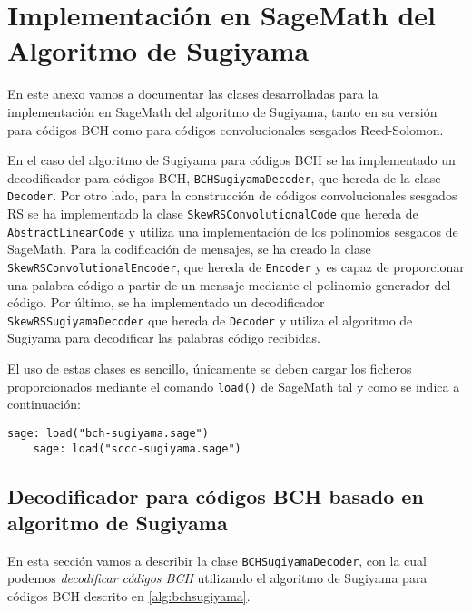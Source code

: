 
\chapter{Implementación en SageMath del Algoritmo de Sugiyama}\label{ap:codigo}

En este anexo vamos a documentar las clases desarrolladas para la implementación en SageMath del algoritmo de Sugiyama, tanto en su versión para códigos BCH como para códigos convolucionales  sesgados Reed-Solomon.

En el caso del algoritmo de Sugiyama para códigos BCH se ha implementado un decodificador para códigos BCH, \texttt{BCHSugiyamaDecoder}, que hereda de la clase \texttt{Decoder}. Por otro lado, para la construcción de códigos convolucionales sesgados RS se ha implementado la clase \texttt{SkewRSConvolutionalCode} que hereda de \texttt{AbstractLinearCode}  y utiliza una implementación de los polinomios sesgados de SageMath. Para la codificación de mensajes, se ha creado la clase \texttt{SkewRSConvolutionalEncoder}, que hereda de \texttt{Encoder} y es capaz de proporcionar una palabra código a partir de un mensaje mediante el polinomio generador del código. Por último, se ha implementado un decodificador \texttt{SkewRSSugiyamaDecoder} que hereda de \texttt{Decoder} y utiliza el algoritmo de Sugiyama para decodificar las palabras código recibidas.

El uso de estas clases es sencillo, únicamente se deben cargar los ficheros proporcionados mediante el comando \texttt{load()} de SageMath tal y como se indica a continuación:

\begin{lstlisting}[gobble=4]
    sage: load("bch-sugiyama.sage")
    sage: load("sccc-sugiyama.sage")
\end{lstlisting}

\section{Decodificador para códigos BCH basado en algoritmo de Sugiyama}

En esta sección vamos a describir la clase \texttt{BCHSugiyamaDecoder}, con la cual podemos \emph{decodificar códigos BCH} utilizando el algoritmo de Sugiyama para códigos BCH descrito en \ref{alg:bchsugiyama}.


